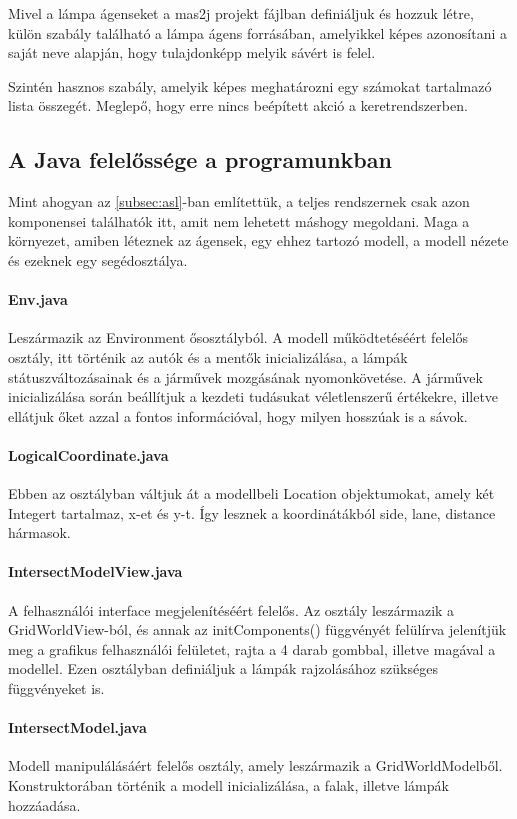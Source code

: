 \documentclass[a4paper, 11pt]{article}
\begin{document}
Mivel a lámpa ágenseket a mas2j projekt fájlban definiáljuk és hozzuk létre, külön szabály található a
lámpa ágens forrásában, amelyikkel képes azonosítani a saját neve alapján, hogy tulajdonképp melyik sávért
is felel.

Szintén hasznos szabály, amelyik képes meghatározni egy számokat tartalmazó lista összegét. Meglepő, hogy
erre nincs beépített akció a keretrendszerben.

\subsection{A Java felelőssége a programunkban}
Mint ahogyan az \autoref{subsec:asl}-ban említettük, a teljes rendszernek csak azon komponensei találhatók
itt, amit nem lehetett máshogy megoldani. Maga a környezet, amiben léteznek az ágensek, egy ehhez tartozó
modell, a modell nézete és ezeknek egy segédosztálya.

\paragraph{Env.java}
Leszármazik az Environment ősosztályból.
A modell működtetéséért felelős osztály, itt történik az autók és a mentők inicializálása,
a lámpák státuszváltozásainak és a járművek mozgásának nyomonkövetése.
A járművek inicializálása során beállítjuk a kezdeti tudásukat véletlenszerű értékekre, illetve
ellátjuk őket azzal a fontos információval, hogy milyen hosszúak is a sávok.

\paragraph{LogicalCoordinate.java}
Ebben az osztályban váltjuk át a modellbeli Location objektumokat, amely két Integert tartalmaz, x-et és y-t. Így lesznek a koordinátákból side, lane, distance hármasok.
\paragraph{IntersectModelView.java}
A felhasználói interface megjelenítéséért felelős. Az osztály leszármazik a GridWorldView-ból, és annak az initComponents() függvényét felülírva jelenítjük meg a grafikus felhasználói felületet, rajta a 4 darab gombbal, illetve magával a modellel. Ezen osztályban definiáljuk a lámpák rajzolásához szükséges függvényeket is.
\paragraph{IntersectModel.java}
Modell manipulálásáért felelős osztály, amely leszármazik a GridWorldModelből. Konstruktorában történik a modell inicializálása, a falak, illetve lámpák hozzáadása.
\end{document}
